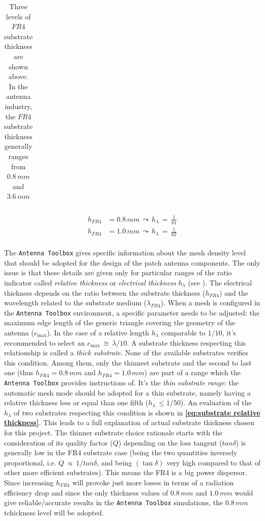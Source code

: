 \documentclass[12pt,a4paper,twocolumn]{article}
\begin{document}
{\begin{table}[bt!]
\begin{center}
{\begin{tabular}{||m{2.5 cm}|m{2.5 cm}|m{2.5 cm}||}
		\end{tabular}}
		\caption{Three levels of $FR4$ substrate thickness are shown above. In the antenna industry, the $FR4$ substrate thickness generally ranges from $0.8\,mm$ and $3.6\,mm$}
		\label{table:substrate tchickness}\end{center}\end{table}
\begin{equation}\begin{aligned}
		h_{FR4} &= 0.8\,mm\,\leadsto\,h_{\lambda}\,=\,\frac{1}{81}\\	h_{FR4} &= 1.0\,mm\,\leadsto\,h_{\lambda}\,=\,\frac{1}{62}\\
	\end{aligned}
	\label{eq:substrate relative thickness}
\end{equation}

The \texttt{\color{Mahogany}Antenna Toolbox} gives specific
information about the mesh density level that should be adopted for the design of the patch antenna components. The only issue is that these details are given only for particular ranges of the ratio indicator called \emph{relative thickness} or \emph{electrical thickness} $h_{\lambda}$ (see \textbf{\cite{makarov}}). The electrical thickness depends on the ratio between the substrate thickness ($h_{FR4}$) and the wavelength related to the substrate medium ($\lambda_{FR4}$). When a mesh is configured in the \texttt{\color{Mahogany}Antenna Toolbox} environment, a specific parameter needs to be adjusted: the maximum edge length of the generic triangle covering the geometry of the antenna ($e_{\max}$). In the case of a relative length $h_\lambda$ comparable to $1/10$, it's recommended to select an $e_{\max}\,\cong\,\lambda/10$. A substrate thickness respecting this relationship is called a \emph{thick substrate}. None of the available substrates verifies this condition. Among them, only the thinnest substrate and the second to last one (thus $h_{FR4}=0.8\,mm$ and $h_{FR4}=1.0\,mm$) are part of a range which the \texttt{\color{Mahogany}Antenna Toolbox} provides instructions of. It's the \emph{thin substrate range}: the automatic mesh mode should be adopted for a thin substrate, namely having a relative thickness less or equal than one fifth ($h_\lambda\,\leq{1/50}$). An evaluation of the $h_\lambda$ of two substrates respecting this condition is shown in \textbf{\cref{eq:substrate relative thickness}}. This leads to a full explanation of actual substrate thickness chosen for this project. The thinner substrate choice rationale starts with the consideration of its quality factor ($Q$) depending on the loss tangent ($tan\delta$) is generally low in the FR4 substrate case (being the two quantities inversely proportional, i.e. $Q\,\propto\,1/tan\delta$, and being $(\tan\delta)$ very high compared to that of other more efficient substrates). This means the FR4 is a big power dispersor. Since increasing $h_{FR4}$ will provoke just more losses in terms of a radiation efficiency drop and since the only thickness values of $0.8\,mm$ and $1.0\,mm$ would give reliable/accurate results in the \texttt{\color{Mahogany}Antenna Toolbox} simulations, the $0.8\,mm$ tchickness level will be adopted. 
}
\end{document}
